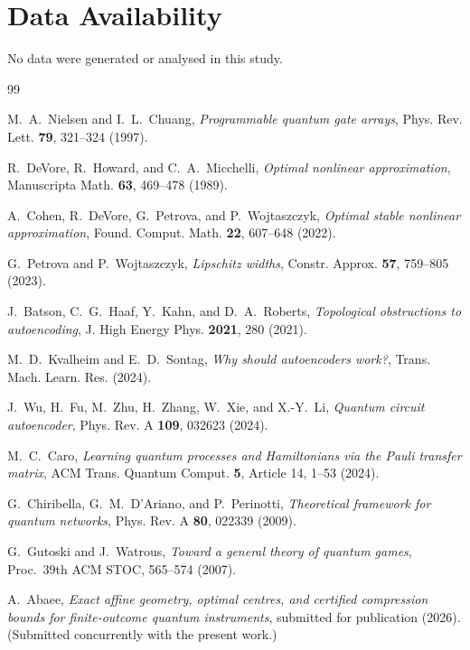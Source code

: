\documentclass[11pt,a4paper]{article}
\theoremstyle{definition}
\theoremstyle{plain}
\theoremstyle{remark}
\begin{document}
\section*{Data Availability}
No data were generated or analysed in this study.

\begin{thebibliography}{99}

M.~A.~Nielsen and I.~L.~Chuang,
\emph{Programmable quantum gate arrays},
Phys. Rev. Lett. \textbf{79}, 321--324 (1997).

R.~DeVore, R.~Howard, and C.~A.~Micchelli,
\emph{Optimal nonlinear approximation},
Manuscripta Math. \textbf{63}, 469--478 (1989).

A.~Cohen, R.~DeVore, G.~Petrova, and P.~Wojtaszczyk,
\emph{Optimal stable nonlinear approximation},
Found. Comput. Math. \textbf{22}, 607--648 (2022).

G.~Petrova and P.~Wojtaszczyk,
\emph{Lipschitz widths},
Constr. Approx. \textbf{57}, 759--805 (2023).

J.~Batson, C.~G.~Haaf, Y.~Kahn, and D.~A.~Roberts,
\emph{Topological obstructions to autoencoding},
J. High Energy Phys. \textbf{2021}, 280 (2021).

M.~D.~Kvalheim and E.~D.~Sontag,
\emph{Why should autoencoders work?},
Trans. Mach. Learn. Res. (2024).

J.~Wu, H.~Fu, M.~Zhu, H.~Zhang, W.~Xie, and X.-Y.~Li,
\emph{Quantum circuit autoencoder},
Phys. Rev. A \textbf{109}, 032623 (2024).

M.~C.~Caro,
\emph{Learning quantum processes and Hamiltonians via the Pauli transfer
matrix},
ACM Trans. Quantum Comput. \textbf{5}, Article 14, 1--53 (2024).

G.~Chiribella, G.~M.~D'Ariano, and P.~Perinotti,
\emph{Theoretical framework for quantum networks},
Phys. Rev. A \textbf{80}, 022339 (2009).

G.~Gutoski and J.~Watrous,
\emph{Toward a general theory of quantum games},
Proc.~39th ACM STOC, 565--574 (2007).

A.~Abaee,
\emph{Exact affine geometry, optimal centres, and certified compression bounds
for finite-outcome quantum instruments},
submitted for publication (2026). (Submitted concurrently with the present work.)


\end{thebibliography}
\end{document}
